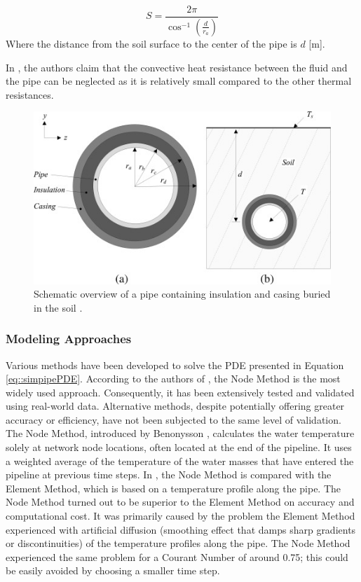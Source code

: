 \begin{equation}\label{eq::shapefactor}
S=\frac{2 \pi}{\cos ^{-1}\left(\frac{d}{r_a}\right)}
\end{equation}
Where the distance from the soil surface to the center of the pipe is $d$ [m]. 

In \cite{booklowT}, the authors claim that the convective heat resistance between the fluid and the pipe can be neglected as it is relatively small compared to the other thermal resistances.  

\begin{figure}
    \centering
    \includegraphics[width=0.5\linewidth]{Literature Survey - DCSC template/figuresLIT/pijpdoorsnede.jpg}
    \caption{Schematic overview of a pipe containing insulation and casing buried in the soil \cite{PipePDE}.}
    \label{fig::pipe}
\end{figure}  

\subsubsection{Modeling Approaches}\label{sec::thermodynamicmethods}
Various methods have been developed to solve the PDE presented in Equation \ref{eq::simpipePDE}. According to the authors of \cite{KUNTUAROVA}, the Node Method is the most widely used approach. Consequently, it has been extensively tested and validated using real-world data. Alternative methods, despite potentially offering greater accuracy or efficiency, have not been subjected to the same level of validation. The Node Method, introduced by Benonysson \cite{BENONYSSON1995297}, calculates the water temperature solely at network node locations, often located at the end of the pipeline. It uses a weighted average of the temperature of the water masses that have entered the pipeline at previous time steps. In \cite{NMvsEM}, the Node Method is compared with the Element Method, which is based on a temperature profile along the pipe. The Node Method turned out to be superior to the Element Method on accuracy and computational cost. It was primarily caused by the problem the Element Method experienced with artificial diffusion (smoothing effect that damps sharp gradients or discontinuities) of the temperature profiles along the pipe. The Node Method experienced the same problem for a Courant Number of around 0.75; this could be easily avoided by choosing a smaller time step. 

